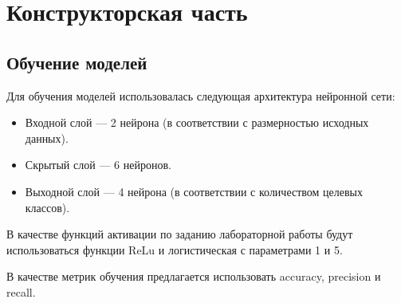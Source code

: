 \chapter{Конструкторская часть}


\section{Обучение моделей}

Для обучения моделей использовалась следующая архитектура нейронной сети:

\begin{itemize}[label*=---]
	\item Входной слой --- 2 нейрона (в соответствии с размерностью исходных данных).
	\item Скрытый слой --- 6 нейронов.
	\item Выходной слой --- 4 нейрона (в соответствии с количеством целевых классов).
\end{itemize}

В качестве функций активации по заданию лабораторной работы будут использоваться функции ReLu и логистическая с параметрами 1 и 5.

В качестве метрик обучения предлагается использовать accuracy, precision и recall.

\clearpage
